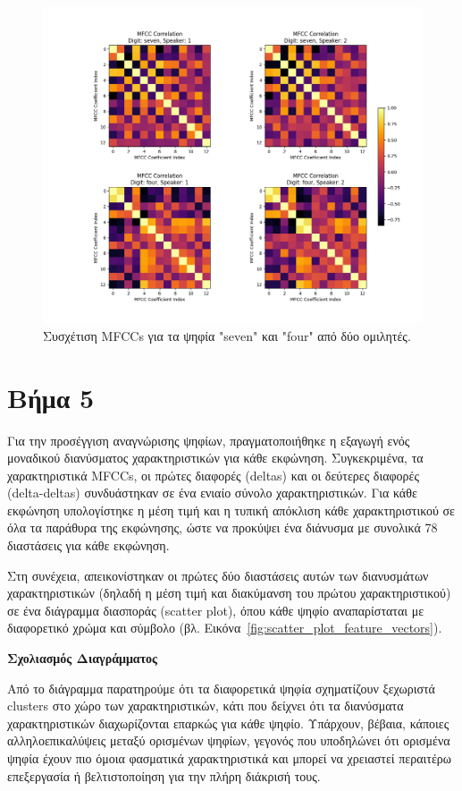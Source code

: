 \documentclass[a4paper,12pt]{article}
\begin{document}
\begin{figure}[h]
    \centering
    \includegraphics[width=\textwidth]{images/corr_mfcc_combined.png}
    \caption{Συσχέτιση MFCCs για τα ψηφία "seven" και "four" από δύο ομιλητές.}
    \label{fig:mfcc_correlation}
\end{figure}

\section*{Βήμα 5}

Για την προσέγγιση αναγνώρισης ψηφίων, πραγματοποιήθηκε η εξαγωγή ενός μοναδικού διανύσματος χαρακτηριστικών για κάθε εκφώνηση. Συγκεκριμένα, τα χαρακτηριστικά MFCCs, οι πρώτες διαφορές (deltas) και οι δεύτερες διαφορές (delta-deltas) συνδυάστηκαν σε ένα ενιαίο σύνολο χαρακτηριστικών. Για κάθε εκφώνηση υπολογίστηκε η μέση τιμή και η τυπική απόκλιση κάθε χαρακτηριστικού σε όλα τα παράθυρα της εκφώνησης, ώστε να προκύψει ένα διάνυσμα με συνολικά 78 διαστάσεις για κάθε εκφώνηση.

Στη συνέχεια, απεικονίστηκαν οι πρώτες δύο διαστάσεις αυτών των διανυσμάτων χαρακτηριστικών (δηλαδή η μέση τιμή και διακύμανση του πρώτου χαρακτηριστικού) σε ένα διάγραμμα διασποράς (scatter plot), όπου κάθε ψηφίο αναπαρίσταται με διαφορετικό χρώμα και σύμβολο (βλ. Εικόνα~\ref{fig:scatter_plot_feature_vectors}).

\textbf{Σχολιασμός Διαγράμματος}

Από το διάγραμμα παρατηρούμε ότι τα διαφορετικά ψηφία σχηματίζουν ξεχωριστά clusters στο χώρο των χαρακτηριστικών, κάτι που δείχνει ότι τα διανύσματα χαρακτηριστικών διαχωρίζονται επαρκώς για κάθε ψηφίο. Υπάρχουν, βέβαια, κάποιες αλληλοεπικαλύψεις μεταξύ ορισμένων ψηφίων, γεγονός που υποδηλώνει ότι ορισμένα ψηφία έχουν πιο όμοια φασματικά χαρακτηριστικά και μπορεί να χρειαστεί περαιτέρω επεξεργασία ή βελτιστοποίηση για την πλήρη διάκρισή τους.
\end{document}
